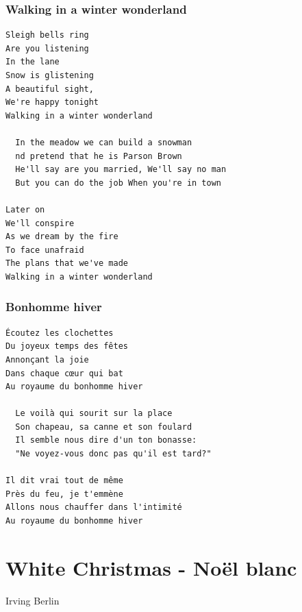 \documentclass[
]{article}
\begin{document}
\hypertarget{walking-in-a-winter-wonderland}{%
\subsubsection*{Walking in a winter
wonderland}\label{walking-in-a-winter-wonderland}}

\begin{verbatim}
Sleigh bells ring
Are you listening
In the lane
Snow is glistening
A beautiful sight,
We're happy tonight
Walking in a winter wonderland

  In the meadow we can build a snowman
  nd pretend that he is Parson Brown
  He'll say are you married, We'll say no man
  But you can do the job When you're in town
  
Later on
We'll conspire
As we dream by the fire
To face unafraid
The plans that we've made
Walking in a winter wonderland
\end{verbatim}

\hypertarget{bonhomme-hiver}{%
\subsubsection*{Bonhomme hiver}\label{bonhomme-hiver}}

\begin{verbatim}
Écoutez les clochettes
Du joyeux temps des fêtes
Annonçant la joie
Dans chaque cœur qui bat
Au royaume du bonhomme hiver

  Le voilà qui sourit sur la place
  Son chapeau, sa canne et son foulard
  Il semble nous dire d'un ton bonasse:
  "Ne voyez-vous donc pas qu'il est tard?"

Il dit vrai tout de même
Près du feu, je t'emmène
Allons nous chauffer dans l'intimité
Au royaume du bonhomme hiver
\end{verbatim}

\hypertarget{white-christmas---nouxebl-blanc}{%
\section{White Christmas - Noël
blanc}\label{white-christmas---nouxebl-blanc}}

Irving Berlin

\hypertarget{section-16}{%
\subsection*{}\label{section-16}}
\end{document}
